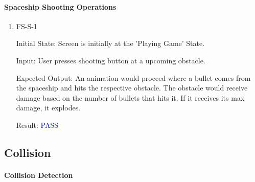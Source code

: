 \documentclass[12pt, titlepage]{article}
\begin{document}
\paragraph{Spaceship Shooting Operations}

\begin{enumerate}

\item{FS-S-1\\}

Initial State: Screen is initially at the 'Playing Game' State. 
					
Input: User presses shooting button at a upcoming obstacle.
					
Expected Output: An animation would proceed where a bullet comes from the spaceship and hits the respective obstacle. The obstacle would receive damage based on the number of bullets that hits it. If it receives its max damage, it explodes.
					
Result: \textcolor{blue}{PASS} 
					
\end{enumerate}

\subsection{Collision}

\paragraph{Collision Detection}
\end{document}
